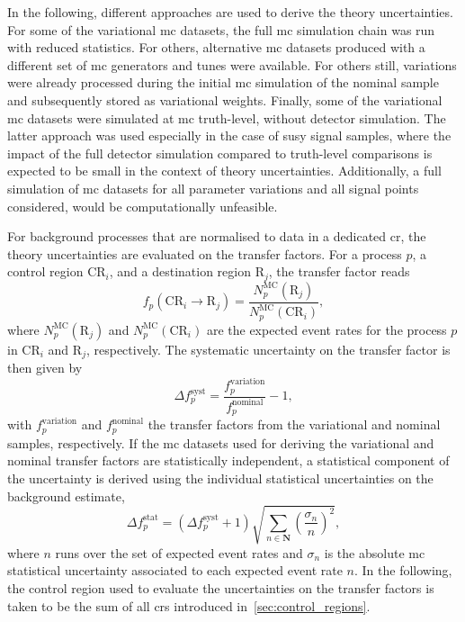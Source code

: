 In the following, different approaches are used to derive the theory uncertainties.
For some of the variational \gls{mc} datasets, the full \gls{mc} simulation chain was run with reduced statistics.
For others, alternative \gls{mc} datasets produced with a different set of \gls{mc} generators and tunes were available.
For others still, variations were already processed during the initial \gls{mc} simulation of the nominal sample and subsequently stored as variational weights.
Finally, some of the variational \gls{mc} datasets were simulated at \gls{mc} truth-level, \ie without detector simulation.
The latter approach was used especially in the case of \gls{susy} signal samples, where the impact of the full detector simulation compared to truth-level comparisons is expected to be small in the context of theory uncertainties.
Additionally, a full simulation of \gls{mc} datasets for all parameter variations and all signal points considered, would be computationally unfeasible. 

For background processes that are normalised to data in a dedicated \gls{cr}, the theory uncertainties are evaluated on the transfer factors.
For a process $p$, a control region CR$_i$, and a destination region R$_j$, the transfer factor reads
\begin{equation}
	f_p(\mathrm{CR}_i\rightarrow \mathrm{R}_j) = \frac{N^\mathrm{MC}_p(\mathrm{R}_j)}{N^\mathrm{MC}_p(\mathrm{CR}_i)},
\end{equation}
where $N^\mathrm{MC}_p(\mathrm{R}_j)$ and $N^\mathrm{MC}_p(\mathrm{CR}_i)$ are the expected event rates for the process $p$ in CR$_i$ and R$_j$, respectively. The systematic uncertainty on the transfer factor is then given by
\begin{equation}
	\Delta f_p^\mathrm{syst} = \frac{f_p^\mathrm{variation}}{f_p^\mathrm{nominal}} - 1,
\end{equation}
with $f_p^\mathrm{variation}$ and $f_p^\mathrm{nominal}$ the transfer factors from the variational and nominal samples, respectively.
If the \gls{mc} datasets used for deriving the variational and nominal transfer factors are statistically independent, a statistical component of the uncertainty is derived using the individual statistical uncertainties on the background estimate,
\begin{equation}
	\Delta f_p^\mathrm{stat} = (\Delta f_p^\mathrm{syst} + 1 ) \sqrt{\sum_{n\in\boldsymbol{N}}(\frac{\sigma_n}{n})^2},
\end{equation}
 where $n$ runs over the set of expected event rates and $\sigma_n$ is the absolute \gls{mc} statistical uncertainty associated to each expected event rate $n$.
 In the following, the control region used to evaluate the uncertainties on the transfer factors is taken to be the sum of all \glspl{cr} introduced in~\cref{sec:control_regions}.
  
